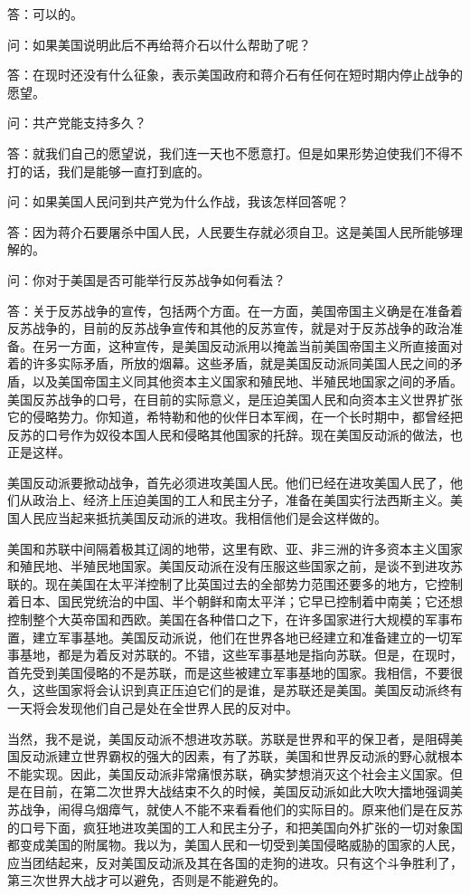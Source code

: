 \documentclass[UTF-8, a5paper, 12pt]{ctexart}
\begin{document}
答：可以的。

问：如果美国说明此后不再给蒋介石以什么帮助了呢？

答：在现时还没有什么征象，表示美国政府和蒋介石有任何在短时期内停止战争的愿望。

问：共产党能支持多久？

答：就我们自己的愿望说，我们连一天也不愿意打。但是如果形势迫使我们不得不打的话，我们是能够一直打到底的。

问：如果美国人民问到共产党为什么作战，我该怎样回答呢？

答：因为蒋介石要屠杀中国人民，人民要生存就必须自卫。这是美国人民所能够理解的。

问：你对于美国是否可能举行反苏战争如何看法？

答：关于反苏战争的宣传，包括两个方面。在一方面，美国帝国主义确是在准备着反苏战争的，目前的反苏战争宣传和其他的反苏宣传，就是对于反苏战争的政治准备。在另一方面，这种宣传，是美国反动派用以掩盖当前美国帝国主义所直接面对着的许多实际矛盾，所放的烟幕。这些矛盾，就是美国反动派同美国人民之间的矛盾，以及美国帝国主义同其他资本主义国家和殖民地、半殖民地国家之间的矛盾。美国反苏战争的口号，在目前的实际意义，是压迫美国人民和向资本主义世界扩张它的侵略势力。你知道，希特勒和他的伙伴日本军阀，在一个长时期中，都曾经把反苏的口号作为奴役本国人民和侵略其他国家的托辞。现在美国反动派的做法，也正是这样。

美国反动派要掀动战争，首先必须进攻美国人民。他们已经在进攻美国人民了，他们从政治上、经济上压迫美国的工人和民主分子，准备在美国实行法西斯主义。美国人民应当起来抵抗美国反动派的进攻。我相信他们是会这样做的。

美国和苏联中间隔着极其辽阔的地带，这里有欧、亚、非三洲的许多资本主义国家和殖民地、半殖民地国家。美国反动派在没有压服这些国家之前，是谈不到进攻苏联的。现在美国在太平洋控制了比英国过去的全部势力范围还要多的地方，它控制着日本、国民党统治的中国、半个朝鲜和南太平洋；它早已控制着中南美；它还想控制整个大英帝国和西欧。美国在各种借口之下，在许多国家进行大规模的军事布置，建立军事基地。美国反动派说，他们在世界各地已经建立和准备建立的一切军事基地，都是为着反对苏联的。不错，这些军事基地是指向苏联。但是，在现时，首先受到美国侵略的不是苏联，而是这些被建立军事基地的国家。我相信，不要很久，这些国家将会认识到真正压迫它们的是谁，是苏联还是美国。美国反动派终有一天将会发现他们自己是处在全世界人民的反对中。

当然，我不是说，美国反动派不想进攻苏联。苏联是世界和平的保卫者，是阻碍美国反动派建立世界霸权的强大的因素，有了苏联，美国和世界反动派的野心就根本不能实现。因此，美国反动派非常痛恨苏联，确实梦想消灭这个社会主义国家。但是在目前，在第二次世界大战结束不久的时候，美国反动派如此大吹大擂地强调美苏战争，闹得乌烟瘴气，就使人不能不来看看他们的实际目的。原来他们是在反苏的口号下面，疯狂地进攻美国的工人和民主分子，和把美国向外扩张的一切对象国都变成美国的附属物。我以为，美国人民和一切受到美国侵略威胁的国家的人民，应当团结起来，反对美国反动派及其在各国的走狗的进攻。只有这个斗争胜利了，第三次世界大战才可以避免，否则是不能避免的。
\end{document}

